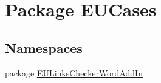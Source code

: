 \hypertarget{namespace_e_u_cases}{\section{Package E\+U\+Cases}
\label{namespace_e_u_cases}
}
\subsection*{Namespaces}
\begin{DoxyCompactItemize}
\item 
package \hyperlink{namespace_e_u_cases_1_1_e_u_links_checker_word_add_in}{E\+U\+Links\+Checker\+Word\+Add\+In}
\end{DoxyCompactItemize}
